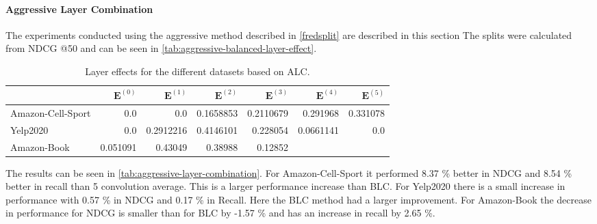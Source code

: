 \paragraph{Aggressive Layer Combination}
The experiments conducted using the aggressive method described in \autoref{fredsplit} are described in this section
The splits were calculated from NDCG @50 and can be seen in \autoref{tab:aggressive-balanced-layer-effect}.
\begin{table}[]
    \centering
    \begin{tabular}{|l|r|r|r|r|r|r|}
        \hline
                          & $\mathbf{E}^{(0)}$ & $\mathbf{E}^{(1)}$ & $\mathbf{E}^{(2)}$ & $\mathbf{E}^{(3)}$ & $\mathbf{E}^{(4)}$ & $\mathbf{E}^{(5)}$ \\ \hline
        Amazon-Cell-Sport & 0.0                & 0.0                & 0.1658853          & 0.2110679          & 0.291968           & 0.331078           \\ \hline
        Yelp2020          & 0.0                & 0.2912216          & 0.4146101          & 0.228054           & 0.0661141          & 0.0                \\ \hline
        Amazon-Book       & 0.051091           & 0.43049            & 0.38988            & 0.12852            &                    &                    \\ \hline
    \end{tabular}
    \caption{Layer effects for the different datasets based on ALC.}
    \label{tab:aggressive-balanced-layer-effect}
\end{table}
The results can be seen in \autoref{tab:aggressive-layer-combination}.
For Amazon-Cell-Sport it performed 8.37 \% better in NDCG and 8.54 \% better in recall than 5 convolution average.
This is a larger performance increase than BLC.
For Yelp2020 there is a small increase in performance with 0.57 \% in NDCG and 0.17 \% in Recall.
Here the BLC method had a larger improvement.
For Amazon-Book the decrease in performance for NDCG is smaller than for BLC by -1.57 \% and has an increase in recall by  2.65 \%.
